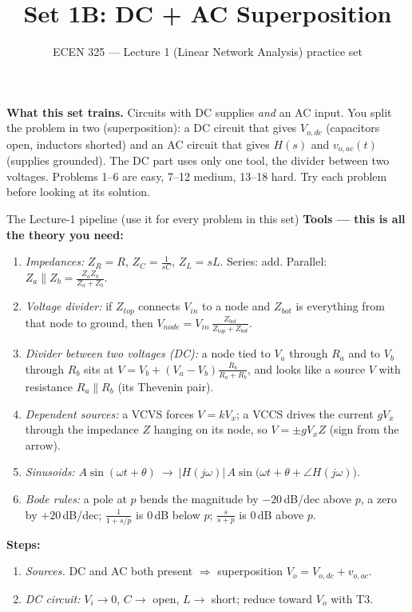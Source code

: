 \documentclass[11pt]{article}
\title{Set 1B: DC + AC Superposition}
\author{ECEN 325 --- Lecture 1 (Linear Network Analysis) practice set}
\date{}
\begin{document}
\maketitle

\textbf{What this set trains.} Circuits with DC supplies \emph{and} an AC input. You split the problem in two
(superposition): a DC circuit that gives $V_{o,dc}$ (capacitors open, inductors shorted) and an AC circuit that
gives $H(s)$ and $v_{o,ac}(t)$ (supplies grounded). The DC part uses only one tool, the divider between two
voltages. Problems 1--6 are easy, 7--12 medium, 13--18 hard. Try each problem before looking at its solution.


\begin{cardbox}{The Lecture-1 pipeline (use it for every problem in this set)}
\textbf{Tools --- this is all the theory you need:}
\begin{enumerate}[label=\textbf{T\arabic*},leftmargin=2.2em,itemsep=1pt]
\item \emph{Impedances:} $Z_R=R$, $Z_C=\frac{1}{sC}$, $Z_L=sL$. Series: add. Parallel:
      $Z_a\parallel Z_b=\frac{Z_aZ_b}{Z_a+Z_b}$.
\item \emph{Voltage divider:} if $Z_{top}$ connects $V_{in}$ to a node and $Z_{bot}$ is everything from that
      node to ground, then $V_{node}=V_{in}\,\frac{Z_{bot}}{Z_{top}+Z_{bot}}$.
\item \emph{Divider between two voltages (DC):} a node tied to $V_a$ through $R_a$ and to $V_b$ through $R_b$ sits at
      $V=V_b+(V_a-V_b)\frac{R_b}{R_a+R_b}$, and looks like a source $V$ with resistance $R_a\parallel R_b$
      (its Thevenin pair).
\item \emph{Dependent sources:} a VCVS forces $V=kV_x$; a VCCS drives the current $gV_x$ through the impedance $Z$
      hanging on its node, so $V=\pm gV_x Z$ (sign from the arrow).
\item \emph{Sinusoids:} $A\sin(\omega t+\theta)\ \to\ |H(j\omega)|\,A\sin\big(\omega t+\theta+\angle H(j\omega)\big)$.
\item \emph{Bode rules:} a pole at $p$ bends the magnitude by $-20$\,dB/dec above $p$, a zero by $+20$\,dB/dec;
      $\frac{1}{1+s/p}$ is $0$\,dB below $p$; $\frac{s}{s+p}$ is $0$\,dB above $p$.
\end{enumerate}
\textbf{Steps:}
\begin{enumerate}[leftmargin=2.2em,itemsep=1pt]
\item \emph{Sources.} DC and AC both present $\Rightarrow$ superposition $V_o=V_{o,dc}+v_{o,ac}$.
\item \emph{DC circuit:} $V_i\to0$, $C\to$ open, $L\to$ short; reduce toward $V_o$ with T3.

\end{enumerate}
\end{cardbox}
\end{document}
